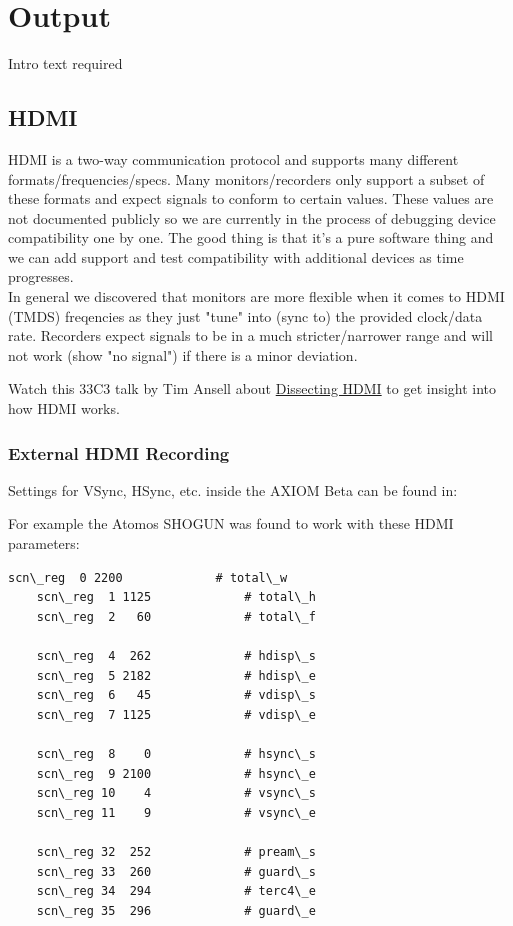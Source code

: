 \section{Output}

Intro text required



\subsection{HDMI}

HDMI is a two-way communication protocol and supports many different formats/frequencies/specs. Many monitors/recorders only support a subset of these formats and expect signals to conform to certain values. These values are not documented publicly so we are currently in the process of debugging device compatibility one by one. The good thing is that it's a pure software thing and we can add support and test compatibility with additional devices as time progresses.\\

In general we discovered that monitors are more flexible when it comes to HDMI (TMDS) freqencies as they just "tune" into (sync to) the provided clock/data rate. Recorders expect signals to be in a much stricter/narrower range and will not work (show "no signal") if there is a minor deviation. 

Watch this 33C3 talk by Tim Ansell about \href{https://media.ccc.de/v/33c3-8057-dissecting_hdmi}{Dissecting HDMI} to get insight into how HDMI works.


\subsubsection{External HDMI Recording}

Settings for VSync, HSync, etc. inside the AXIOM Beta can be found in: 


For example the Atomos SHOGUN was found to work with these HDMI parameters:  
   
\begin{lstlisting}[breaklines=true, breakatwhitespace=true]
scn\_reg  0 2200             # total\_w
    scn\_reg  1 1125             # total\_h
    scn\_reg  2   60             # total\_f
     
    scn\_reg  4  262             # hdisp\_s
    scn\_reg  5 2182             # hdisp\_e
    scn\_reg  6   45             # vdisp\_s
    scn\_reg  7 1125             # vdisp\_e
     
    scn\_reg  8    0             # hsync\_s
    scn\_reg  9 2100             # hsync\_e
    scn\_reg 10    4             # vsync\_s
    scn\_reg 11    9             # vsync\_e
     
    scn\_reg 32  252             # pream\_s
    scn\_reg 33  260             # guard\_s
    scn\_reg 34  294             # terc4\_e
    scn\_reg 35  296             # guard\_e
\end{lstlisting}
   

